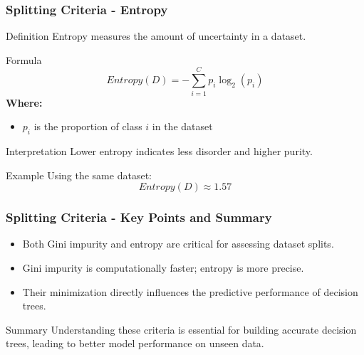 \documentclass[aspectratio=169]{beamer}
\begin{document}
\begin{frame}[fragile]
    \frametitle{Splitting Criteria - Entropy}
    \begin{block}{Definition}
        Entropy measures the amount of uncertainty in a dataset.
    \end{block}
    
    \begin{block}{Formula}
        \begin{equation}
            Entropy(D) = - \sum_{i=1}^{C} p_i \log_2(p_i)
        \end{equation}
        \textbf{Where:}
        \begin{itemize}
            \item \( p_i \) is the proportion of class \( i \) in the dataset
        \end{itemize}
    \end{block}
    
    \begin{block}{Interpretation}
        Lower entropy indicates less disorder and higher purity.
    \end{block}
    
    \begin{block}{Example}
        Using the same dataset:
        \[
        Entropy(D) \approx 1.57
        \]
    \end{block}
    
\end{frame}

\begin{frame}[fragile]
    \frametitle{Splitting Criteria - Key Points and Summary}
    \begin{itemize}
        \item Both Gini impurity and entropy are critical for assessing dataset splits.
        \item Gini impurity is computationally faster; entropy is more precise.
        \item Their minimization directly influences the predictive performance of decision trees.
    \end{itemize}
    
    \begin{block}{Summary}
        Understanding these criteria is essential for building accurate decision trees, leading to better model performance on unseen data.
    \end{block}
\end{frame}
\end{document}

